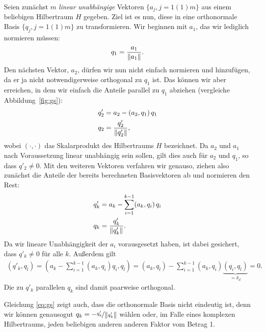 Seien zunächst $m$ \emph{linear unabhängige} Vektoren $\{a_j,
j=1(1)m\}$ aus einem beliebigen Hilbertraum $H$ gegeben. Ziel ist es
nun, diese in eine orthonormale Basis $\{q_j, j=1(1)m \}$ zu
transformieren. Wir beginnen mit $a_1$, das wir lediglich normieren
müssen:
\begin{equation}
  q_1 = \frac{a_1}{\left\lVert{a_1}\right\rVert}.
\end{equation}
Den nächsten Vektor, $a_2$, dürfen wir nun nicht einfach normieren und
hinzufügen, da er ja nicht notwendigerweise orthogonal zu $q_1$
ist. Das können wir aber erreichen, in dem wir einfach die Anteile
parallel zu $q_1$ abziehen (vergleiche Abbildung~\ref{fig:gs}):
\begin{align*}
  q'_2 &= a_2 - (a_2, q_1)\,q_1\\
  q_2 &= \frac{q'_2}{\left\lVert{q'_2}\right\rVert},
\end{align*}
wobei $(\cdot,\cdot)$ das Skalarprodukt des Hilbertraums $H$
bezeichnet.  Da $a_2$ und $a_1$ nach Voraussetzung linear unabhängig
sein sollen, gilt dies auch für $a_2$ und $q_1$, so dass $q'_2\neq
0$. Mit den weiteren Vektoren verfahren wir genauso, ziehen also
zunächst die Anteile der bereits berechneten Basisvektoren ab und
normieren den Rest:
\begin{align}
  \label{eq:gs}
  q'_k &= a_k - \sum_{i=1}^{k-1} (a_k, q_i)\,q_i\\
  q_k &= \frac{q'_k}{\left\lVert{q'_k}\right\rVert}.
\end{align}
Da wir lineare Unabhängigkeit der $a_i$ vorausgesetzt haben, ist dabei
gesichert, dass $q'_k\neq 0$ für alle $k$. Außerdem gilt
\begin{align}
  (q'_k,q_l) = \left(a_k - \sum_{i=1}^{k-1} (a_k, q_i) q_i, q_l\right) =
  (a_k, q_l) - \sum_{i=1}^{k-1} (a_k, q_i) \underbrace{(q_i,
    q_l)}_{=\delta_{il}} = 0.
\end{align}
Die zu $q'_k$ parallelen $q_k$ sind damit paarweise orthogonal.

Gleichung \eqref{eq:gs} zeigt auch, dass die orthonormale Basis nicht
eindeutig ist, denn wir können genausogut
$q_k=-\nicefrac{q'_k}{\left\lVert{q'_k}\right\rVert}$ wählen oder, im Falle eines
komplexen Hilbertraums, jeden beliebigen anderen anderen Faktor vom
Betrag 1.

